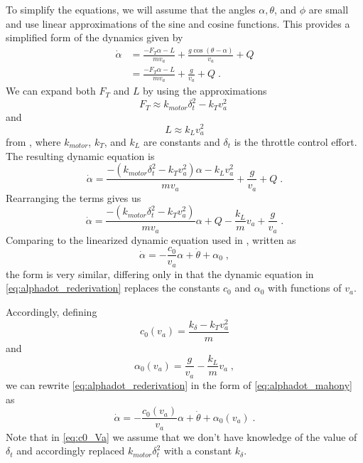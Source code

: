 To simplify the equations, we will assume that the angles $\alpha, \theta$, and $\phi$ are small and use linear approximations of the sine and cosine functions.
This provides a simplified form of the dynamics given by
\begin{align}
\dot{\alpha} &= \frac{-F_T\alpha - L}{mv_a} + \frac{g\cos(\theta - \alpha)}{v_a} + Q \\
			 &= \frac{-F_T\alpha - L}{mv_a} + \frac{g}{v_a} + Q \;.
\end{align}
We can expand both $F_T$ and $L$ by using the approximations
\begin{equation}
F_T \approx k_{motor}\delta_t^2 - k_T v_a^2 \;
\end{equation}
and
\begin{equation}
L \approx k_L v_a^2
\end{equation}
from \cite{BeardMcLain12},
where $k_{motor}$, $k_T$, and $k_L$ are constants and $\delta_t$ is the throttle control effort.
The resulting dynamic equation is
\begin{equation}
\dot{\alpha} = \frac{-(k_{motor}\delta_t^2 - k_T v_a^2)\alpha - k_L v_a^2}{mv_a} + \frac{g}{v_a} + Q \;.
\end{equation}
Rearranging the terms gives us
\begin{equation} \label{eq:alphadot_rederivation}
\dot{\alpha} = \frac{-(k_{motor}\delta_t^2 - k_T v_a^2)}{mv_a}\alpha + Q - \frac{k_L}{m} v_a + \frac{g}{v_a} \;.
\end{equation}
Comparing to the linearized dynamic equation used in \cite{Mahony11}, written as
\begin{equation} \label{eq:alphadot_mahony}
\dot{\alpha} = -\frac{c_0}{v_a}\alpha + \dot{\theta} + \alpha_0 \;,
\end{equation}
the form is very similar, differing only in that the dynamic equation in \eqref{eq:alphadot_rederivation} replaces the constants $c_0$ and $\alpha_0$ with functions of $v_a$.

Accordingly, defining
\begin{equation} \label{eq:c0_Va}
c_0(v_a) = \frac{k_\delta - k_T v_a^2}{m}
\end{equation}
and
\begin{equation}
\alpha_0(v_a) = \frac{g}{v_a} - \frac{k_L}{m}v_a \;,
\end{equation}
we can rewrite \eqref{eq:alphadot_rederivation} in the form of \eqref{eq:alphadot_mahony} as
\begin{equation} \label{eq:alphadot_final}
\dot{\alpha} = -\frac{c_0(v_a)}{v_a}\alpha + \dot{\theta} + \alpha_0(v_a) \;.
\end{equation}
Note that in \eqref{eq:c0_Va} we assume that we don't have knowledge of the value of $\delta_t$ and accordingly replaced $k_{motor}\delta_t^2$ with a constant $k_\delta$.

